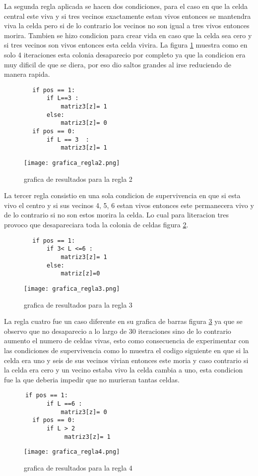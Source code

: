 \documentclass[a4paper, 11pt]{article}
\begin{document}
La segunda regla aplicada se hacen dos condiciones, para el caso en que la celda central este viva y si tres vecinos exactamente estan vivos entonces se mantendra viva la celda pero si de lo contrario los vecinos no son igual a tres vivos entonces morira. Tambien se hizo condicion para crear vida en caso que la celda sea cero y si tres vecinos son vivos entonces esta celda vivira.
La figura \ref{regla2} muestra como en solo 4 iteraciones esta colonia desaparecio por completo ya que la condicion era muy dificil de que se diera, por eso dio saltos grandes al irse reduciendo de manera rapida.
\begin{verbatim}
        if pos == 1:  
            if L==3 : 
                matriz3[z]= 1
            else:
                matriz3[z]= 0
        if pos == 0:  
            if L == 3  :  
                matriz3[z]= 1
\end{verbatim}
\begin{figure}[H]
  \centering      
  \caption{grafica de resultados para la regla 2}  
  \texttt{[image: grafica\_regla2.png]}
  \label{regla2}
\end{figure}


La tercer regla consistio en una sola condicion de supervivencia en que si esta vivo el centro y si sus vecinos 4, 5, 6 estan vivos entonces este permanecera vivo y de lo contrario si no son estos morira la celda. Lo cual para literacion tres provoco que desapareciara toda la colonia de celdas figura \ref{regla3}.
\begin{verbatim}
        if pos == 1:  
            if 3< L <=6 : 
                matriz3[z]= 1           
            else:
                matriz[z]=0
\end{verbatim}
\begin{figure}[H]
  \centering      
  \caption{grafica de resultados para la regla 3}  
  \texttt{[image: grafica\_regla3.png]}
  \label{regla3}
\end{figure}

La regla cuatro fue un caso diferente en su grafica de barras figura \ref{regla4} ya que se observo que no desaparecio a lo largo de 30 iteraciones sino de lo contrario aumento el numero de celdas vivas, esto como consecuencia de experimentar con las condiciones de supervivencia como lo muestra el codigo siguiente en que si la celda era uno y seis de sus vecinos vivian entonces este moria y caso contrario si la celda era cero y un vecino estaba vivo la celda cambia a uno, esta condicion fue la que deberia impedir que no murieran tantas celdas. 
\begin{verbatim}
      if pos == 1:  
            if L ==6 : 
                matriz3[z]= 0           
        if pos == 0:
            if L > 2
                 matriz3[z]= 1 
\end{verbatim}
\begin{figure}[H]
  \centering      
  \caption{grafica de resultados para la regla 4}  
  \texttt{[image: grafica\_regla4.png]}
  \label{regla4}
\end{figure}
\end{document}
